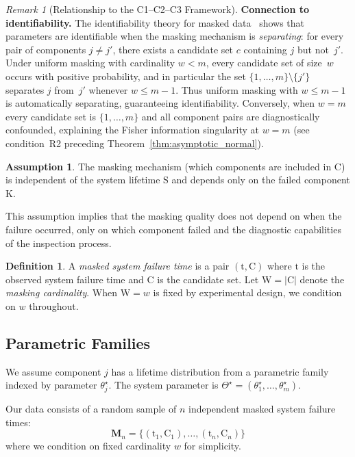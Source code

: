 \documentclass[12pt]{article}
\newcommand{\RV}[1]{\mathrm{#1}}
\newcommand{\sv}{\RV{S}}           %
\newcommand{\cand}{\RV{C}}         %
\newcommand{\ti}{\mathrm{t}}       %
\newcommand{\sysparam}{\Theta}
\newcommand{\tparam}[1]{{#1}^{\star}}  %
\newcommand{\mfs}{\mathbf{M}_n}
\theoremstyle{definition}
\newtheorem{definition}[theorem]{Definition}
\newtheorem{assumption}[theorem]{Assumption}
\theoremstyle{remark}
\newtheorem{remark}[theorem]{Remark}
\begin{document}
\begin{remark}[Relationship to the C1--C2--C3 Framework]
\medskip
\noindent\textbf{Connection to identifiability.}
The identifiability theory for masked data~\cite{towell2025masked} shows that parameters are identifiable when the masking mechanism is \emph{separating}: for every pair of components $j \neq j'$, there exists a candidate set $c$ containing $j$ but not~$j'$.  Under uniform masking with cardinality $w < m$, every candidate set of size~$w$ occurs with positive probability, and in particular the set $\{1,\ldots,m\} \setminus \{j'\}$ separates $j$ from~$j'$ whenever $w \leq m-1$.  Thus uniform masking with $w \leq m-1$ is automatically separating, guaranteeing identifiability.  Conversely, when $w = m$ every candidate set is $\{1,\ldots,m\}$ and all component pairs are diagnostically confounded, explaining the Fisher information singularity at $w = m$ (see condition~R2 preceding Theorem~\ref{thm:asymptotic_normal}).
\end{remark}

\begin{assumption}
\label{asm:masking_indep}
The masking mechanism (which components are included in $\cand$) is independent of the system lifetime $\sv$ and depends only on the failed component $\RV{K}$.
\end{assumption}

This assumption implies that the masking quality does not depend on when the failure occurred, only on which component failed and the diagnostic capabilities of the inspection process.

\begin{definition}
A \emph{masked system failure time} is a pair $(\ti, \cand)$ where $\ti$ is the observed system failure time and $\cand$ is the candidate set. Let $\RV{W} = |\cand|$ denote the \emph{masking cardinality}. When $\RV{W} = w$ is fixed by experimental design, we condition on $w$ throughout.
\end{definition}

\subsection{Parametric Families}

We assume component $j$ has a lifetime distribution from a parametric family indexed by parameter $\tparam{\theta}_j$. The system parameter is $\tparam{\sysparam} = (\tparam{\theta}_1, \ldots, \tparam{\theta}_m)$.

Our data consists of a random sample of $n$ independent masked system failure times:
\begin{equation}
\mfs = \{(\ti_1, \cand_1), \ldots, (\ti_n, \cand_n)\}
\end{equation}
where we condition on fixed cardinality $w$ for simplicity.
\end{document}
